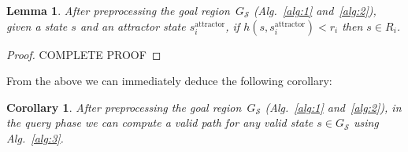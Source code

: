 \documentclass[letterpaper]{article} %
\newcommand{\calS}{\ensuremath{\mathcal{S}}\xspace}
\newcommand{\sAttract}{\ensuremath{s^{\text{attractor}}_i}\xspace}
\newcommand{\sGoal}{\ensuremath{s_{\text{goal}}\xspace}}
\newtheorem{theorem}{Theorem}
\newtheorem{lemma}{Lemma}
\newtheorem{cor}{Corollary}
\newcommand{\update}[1]{{\color{magenta}#1}}
\begin{document}
\begin{lemma}
	After preprocessing the goal region~$G_\calS$ (Alg.~\ref{alg:1} and~\ref{alg:2}), given a state $s$ and an attractor state \sAttract,  if $h(s, \sAttract) < r_i$ then $s \in R_i$.
\end{lemma}

\begin{proof}
	\update{COMPLETE PROOF}
\end{proof}

From the above we can immediately deduce the following corollary:

\vspace{2mm}

\begin{cor}
	After preprocessing the goal region~$G_\calS$ (Alg.~\ref{alg:1} and~\ref{alg:2}), in the query phase we can compute a valid path for any valid state $s \in G_\calS$ using Alg.~\ref{alg:3}.
\end{cor}
%
%
%
%
%
%
%
%
%
\end{document}
